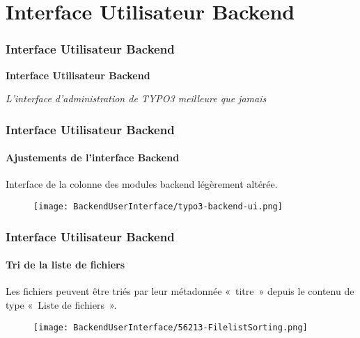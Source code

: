 %

\section{Interface Utilisateur Backend}
\begin{frame}[fragile]
	\frametitle{Interface Utilisateur Backend}

	\begin{center}\huge{\color{typo3darkgrey}\textbf{Interface Utilisateur Backend}}\end{center}
	\begin{center}\large{\textit{L'interface d'administration de TYPO3 meilleure que jamais}}\end{center}

\end{frame}


\begin{frame}[fragile]
	\frametitle{Interface Utilisateur Backend}
	\framesubtitle{Ajustements de l'interface Backend}

	Interface de la colonne des modules backend légèrement altérée.

	\begin{figure}
		\texttt{[image: BackendUserInterface/typo3-backend-ui.png]}
	\end{figure}

\end{frame}


\begin{frame}[fragile]
	\frametitle{Interface Utilisateur Backend}
	\framesubtitle{Tri de la liste de fichiers}

	Les fichiers peuvent être triés par leur métadonnée «~titre~» depuis le contenu de type
	«~Liste de fichiers~».

	\begin{figure}
		\texttt{[image: BackendUserInterface/56213-FilelistSorting.png]}
	\end{figure}

\end{frame}

